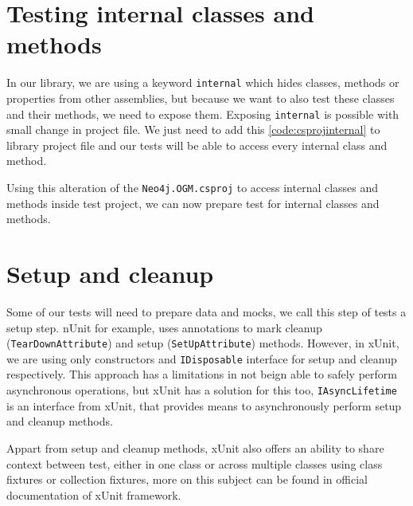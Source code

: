 \section{Testing internal classes and methods}

In our library, we are using a keyword \texttt{internal} which hides classes, methods or properties from other assemblies,
but because we want to also test these classes and their methods, we need to expose them. Exposing \texttt{internal} is possible
with small change in project file. We just need to add this \ref{code:csprojinternal} to library project file and our tests will be able to access every internal
class and method.


Using this alteration of the \texttt{Neo4j.OGM.csproj} to access internal classes and methods inside test project,
we can now prepare test for internal classes and methods.

\section {Setup and cleanup}

Some of our tests will need to prepare data and mocks, we call this step of tests a setup step. nUnit for example, uses annotations
to mark cleanup (\texttt{TearDownAttribute}) and setup (\texttt{SetUpAttribute}) methods. However, in xUnit, we are using only constructors and \texttt{IDisposable}
interface for setup and cleanup respectively. This approach has a limitations in not beign able to safely perform asynchronous operations,
but xUnit has a solution for this too, \texttt{IAsyncLifetime} is an interface from xUnit, that provides means to asynchronously perform setup and cleanup
methods.


Appart from setup and cleanup methods, xUnit also offers an ability to share context between test, either in one class or across multiple classes
using class fixtures or collection fixtures, more on this subject can be found in official documentation of xUnit framework.



